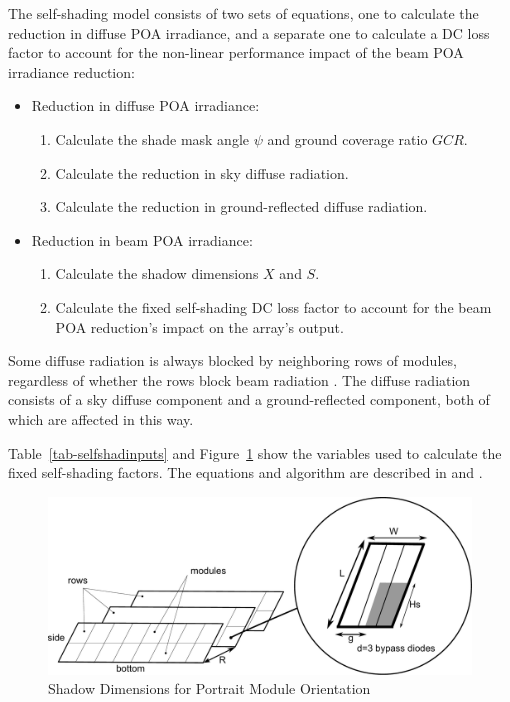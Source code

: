 \documentclass[12pt,letterpaper]{article}
\newcommand\GCR{\ensuremath{\mathit{GCR}}}
\begin{document}
The self-shading model consists of two sets of equations, one to calculate the reduction in diffuse POA irradiance, and a separate one to calculate a DC loss factor to account for the non-linear performance impact of the beam POA irradiance reduction:

\begin{itemize}
\item Reduction in diffuse POA irradiance:
\begin{enumerate}
\item Calculate the shade mask angle $\psi$ and ground coverage ratio $\GCR$.
\item Calculate the reduction in sky diffuse radiation.
\item Calculate the reduction in ground-reflected diffuse radiation.
\end{enumerate}
\item Reduction in beam POA irradiance:
\begin{enumerate}
\item Calculate the shadow dimensions $X$ and $S$.
\item Calculate the fixed self-shading DC loss factor to account for the beam POA reduction's impact on the array's output.
\end{enumerate}
\end{itemize}

Some diffuse radiation is always blocked by neighboring rows of modules, regardless of whether the rows block beam radiation \citep{goswami1989}. The diffuse radiation consists of a sky diffuse component and a ground-reflected component, both of which are affected in this way.

Table~\ref{tab-selfshadinputs} and Figure~\ref{fig-selfshaddimensions} show the variables used to calculate the fixed self-shading factors. The equations and algorithm are described in \citep{appelbaum1979} and \citep{deline2013a}.

\begin{figure}
\begin{center}
\includegraphics[scale=0.33]{self-shading-shadow-dimensions}
\caption{Shadow Dimensions for Portrait Module Orientation}
\label{fig-selfshaddimensions}
\end{center}
\end{figure}
\end{document}
